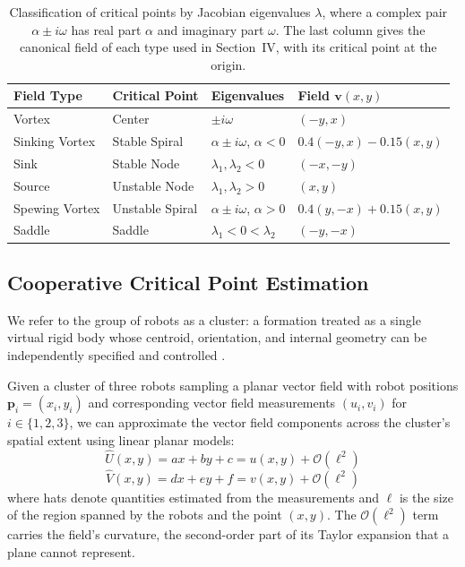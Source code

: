 \documentclass[lettersize,journal]{IEEEtran}
\begin{document}
\begin{table}[!t]
    \centering
    \caption{Classification of critical points by Jacobian eigenvalues $\lambda$, where a complex pair $\alpha \pm i\omega$ has real part $\alpha$ and imaginary part $\omega$. The last column gives the canonical field of each type used in Section~IV, with its critical point at the origin.}
    \label{tab:field_summary}
    \footnotesize
    \setlength{\tabcolsep}{2pt}
    \begin{tabular}{llll}
    \hline
    \textbf{Field Type} & \textbf{Critical Point} & \textbf{Eigenvalues} & \textbf{Field $\mathbf{v}(x, y)$} \\
    \hline
    Vortex & Center & $\pm i\omega$ & $(-y, x)$ \\
    Sinking Vortex & Stable Spiral & $\alpha \pm i\omega$, $\alpha < 0$ & $0.4(-y,x) - 0.15(x,y)$ \\
    Sink & Stable Node & $\lambda_1, \lambda_2 < 0$ & $(-x, -y)$ \\
    Source & Unstable Node & $\lambda_1, \lambda_2 > 0$ & $(x, y)$ \\
    Spewing Vortex & Unstable Spiral & $\alpha \pm i\omega$, $\alpha > 0$ & $0.4(y,-x) + 0.15(x,y)$ \\
    Saddle & Saddle & $\lambda_1 < 0 < \lambda_2$ & $(-y, -x)$ \\
    \hline
    \end{tabular}
\end{table}


\subsection{Cooperative Critical Point Estimation}
\noindent

We refer to the group of robots as a cluster: a formation treated as a single virtual rigid body whose centroid, orientation, and internal geometry can be independently specified and controlled \cite{50,51}.

Given a cluster of three robots sampling a planar vector field with robot positions $\mathbf{p}_i = (x_i, y_i)$ and corresponding vector field measurements $(u_i, v_i)$ for $i \in \{1, 2, 3\}$, we can approximate the vector field components across the cluster's spatial extent using linear planar models:
\begin{equation}\label{eq:2}
\hat{U}(x,y) = ax + by + c = u(x,y) + \mathcal{O}(\ell^2)
\end{equation}
\begin{equation}\label{eq:3}
\hat{V}(x,y) = dx + ey + f = v(x,y) + \mathcal{O}(\ell^2)
\end{equation}
where hats denote quantities estimated from the measurements and $\ell$ is the size of the region spanned by the robots and the point $(x,y)$. The $\mathcal{O}(\ell^2)$ term carries the field's curvature, the second-order part of its Taylor expansion that a plane cannot represent.
\end{document}
